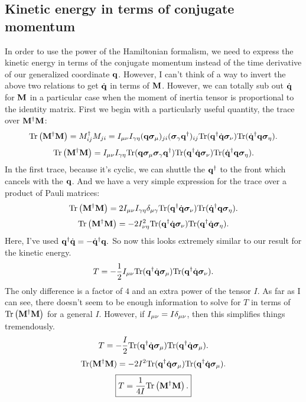 \documentclass[12pt]{article}
\begin{document}
\subsection{Kinetic energy in terms of conjugate momentum}
In order to use the power of the Hamiltonian formalism, we need to express the 
kinetic energy in terms of the conjugate momentum instead of the time 
derivative of our generalized coordinate $\mathbf{q}$. However, I can't think of a 
way to invert the above two relations to get $\dot{\mathbf{q}}$ in terms of $\mathbf{M}$. 
However, we can totally sub out $\dot{\mathbf{q}}$ for $\mathbf{M}$ in a particular case 
when the moment of inertia tensor is proportional to the identity matrix. First 
we begin with a particularly useful quantity, the trace over $\mathbf{M}^\dagger 
\mathbf{M}$:
\[ \mathrm{Tr}\left(\mathbf{M}^\dagger \mathbf{M}\right) = M^\dagger_{ij}M_{ji} = I_{\mu\nu}I_{\gamma\eta} 
(\mathbf{q} \bm{\sigma}_\mu)_{ji} (\bm{\sigma}_\gamma \mathbf{q}^\dagger)_{ij} \mathrm{Tr}(\mathbf{q} ^\dagger \dot{\mathbf{q}} \bm{\sigma}_\nu) \mathrm{Tr}(\dot{\mathbf{q}}^\dagger \mathbf{q} \bm{\sigma}_\eta).\]
\[ \mathrm{Tr}\left(\mathbf{M}^\dagger \mathbf{M}\right) = I_{\mu\nu}I_{\gamma\eta} \mathrm{Tr}(\mathbf{q} 
\bm{\sigma}_\mu \bm{\sigma}_\gamma \mathbf{q}^\dagger) \mathrm{Tr}(\mathbf{q} ^\dagger \dot{\mathbf{q}} 
\bm{\sigma}_\nu) \mathrm{Tr}(\dot{\mathbf{q}}^\dagger \mathbf{q} \bm{\sigma}_\eta).\]
In the first trace, because it's cyclic, we can shuttle the $\mathbf{q}^\dagger$ to the 
front which cancels with the $\mathbf{q}$. And we have a very simple expression for 
the trace over a product of Pauli matrices:
\[ \mathrm{Tr}\left(\mathbf{M}^\dagger \mathbf{M}\right) = 2I_{\mu\nu}I_{\gamma\eta}\delta_{\mu\gamma} 
\mathrm{Tr}(\mathbf{q} ^\dagger \dot{\mathbf{q}} 
\bm{\sigma}_\nu) \mathrm{Tr}(\dot{\mathbf{q}}^\dagger \mathbf{q} \bm{\sigma}_\eta).\]
\[ \mathrm{Tr}\left(\mathbf{M}^\dagger \mathbf{M}\right) = -2I^2_{\nu\eta} \mathrm{Tr}(\mathbf{q} ^\dagger 
\dot{\mathbf{q}}\bm{\sigma}_\nu) \mathrm{Tr}(\mathbf{q} ^\dagger 
\dot{\mathbf{q}}\bm{\sigma}_\eta).\]
Here, I've used $\mathbf{q}^\dagger \dot{\mathbf{q}} = - \dot{\mathbf{q}}^\dagger \mathbf{q}.$ So now this 
looks extremely similar to our result for the kinetic energy.
\[ T = -\frac{1}{2} I_{\mu\nu} \mathrm{Tr}(\mathbf{q} ^\dagger \dot{\mathbf{q}}\bm{\sigma}_\mu) 
\mathrm{Tr}(\mathbf{q} ^\dagger \dot{\mathbf{q}}\bm{\sigma}_\nu).\]
The only difference is a factor of $4$ and an extra power of the tensor $I$. As 
far as I can see, there doesn't seem to be enough information to solve for $T$ 
in terms of $\mathrm{Tr}\left(\mathbf{M}^\dagger \mathbf{M}\right)$ for a general $I$. However, if 
$I_{\mu\nu} = I\delta_{\mu\nu}$, then this simplifies things tremendously.
\[ T = -\frac{I}{2} \mathrm{Tr}(\mathbf{q}^\dagger \dot{\mathbf{q}} \bm{\sigma}_\mu)\mathrm{Tr}(\mathbf{q}^\dagger \dot{\mathbf{q}} \bm{\sigma}_\mu).\]
\[ \mathrm{Tr}(\mathbf{M}^\dagger \mathbf{M}) = -2I^2\mathrm{Tr}(\mathbf{q}^\dagger \dot{\mathbf{q}} 
\bm{\sigma}_\mu)\mathrm{Tr}(\mathbf{q}^\dagger \dot{\mathbf{q}} \bm{\sigma}_\mu).\]
\[ \boxed { T = \frac{1}{4I} \mathrm{Tr}\left(\mathbf{M} ^\dagger \mathbf{M}\right).}\]

\end{document}
